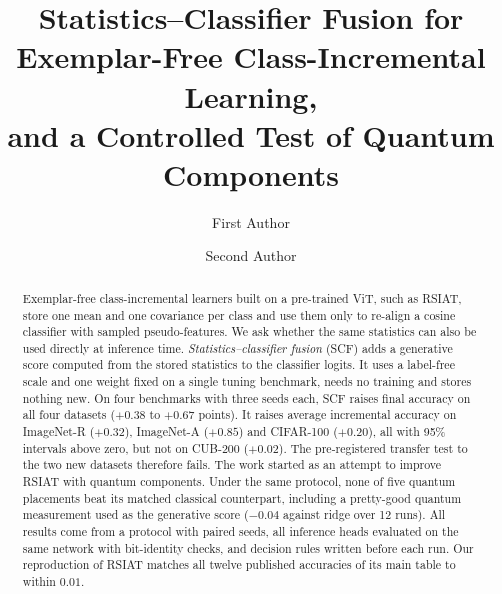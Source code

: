 \documentclass[runningheads]{llncs}
\begin{document}
\title{Statistics--Classifier Fusion for Exemplar-Free
Class-Incremental Learning,\\ and a Controlled Test of Quantum Components}  %
\author{First Author \and Second Author}  %

\maketitle

\begin{abstract}
Exemplar-free class-incremental learners built on a pre-trained ViT, such as
RSIAT, store one mean and one covariance per class and use them only to
re-align a cosine classifier with sampled pseudo-features. We ask whether
the same statistics can also be used directly at inference time.
\emph{Statistics--classifier fusion} (SCF) adds a generative score computed
from the stored statistics to the classifier logits. It uses a label-free
scale and one weight fixed on a single tuning benchmark, needs no training
and stores nothing new. On four benchmarks with three seeds each, SCF raises
final accuracy on all four datasets ($+0.38$ to $+0.67$ points). It raises
average incremental accuracy on ImageNet-R ($+0.32$), ImageNet-A ($+0.85$)
and CIFAR-100 ($+0.20$), all with 95\% intervals above zero, but not on
CUB-200 ($+0.02$). The pre-registered transfer test to the two new datasets
therefore fails. The work started as an attempt to improve RSIAT with
quantum components. Under the same protocol, none of five quantum
placements beat its matched classical counterpart, including a
pretty-good quantum measurement used as the generative score ($-0.04$
against ridge over 12 runs). All results come from a protocol with paired
seeds, all inference heads evaluated on the same network with bit-identity
checks, and decision rules written before each run. Our reproduction of
RSIAT matches all twelve published accuracies of its main table to within
$0.01$.
\end{abstract}












\end{document}
